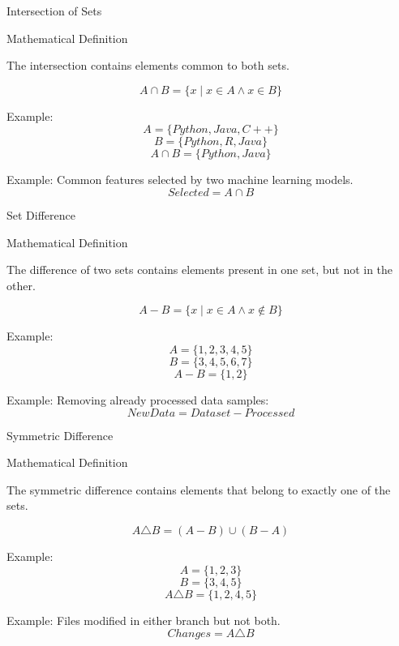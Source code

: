 \begin{frame}{Intersection of Sets}

\begin{block}{Mathematical Definition}

\vspace{0.1cm}

The intersection contains elements common to both sets.

\[
A\cap B=\{x\mid x\in A\land x\in B\}
\]

\end{block}

Example:
\[
A=\{Python,Java,C++\}
\]
\[
B=\{Python,R,Java\}
\]
\[
A\cap B=\{Python,Java\}
\]

Example:
Common features selected by two machine learning models.
\[
Selected=A\cap B
\]

\end{frame}



\begin{frame}{Set Difference}

\begin{block}{Mathematical Definition}

\vspace{0.1cm}

The difference of two sets contains elements present in
one set, but not in the other.

\[
A-B=\{x\mid x\in A\land x\notin B\}
\]

\end{block}

Example:
\[
A=\{1,2,3,4,5\}
\]
\[
B=\{3,4,5,6,7\}
\]
\[
A-B=\{1,2\}
\]

Example:
Removing already processed data samples:
\[
NewData=Dataset-Processed
\]

\end{frame}

\begin{frame}{Symmetric Difference}

\begin{block}{Mathematical Definition}

\vspace{0.1cm}

The symmetric difference contains elements that belong
to exactly one of the sets.

\[
A\triangle B=(A-B)\cup(B-A)
\]

\end{block}

Example:
\[
A=\{1,2,3\}
\]
\[
B=\{3,4,5\}
\]
\[
A\triangle B=\{1,2,4,5\}
\]

Example:
Files modified in either branch but not both.
\[
Changes=A\triangle B
\]

\end{frame}

